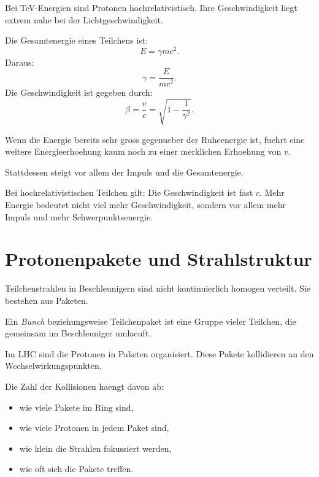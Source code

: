 Bei TeV-Energien sind Protonen hochrelativistisch.
Ihre Geschwindigkeit liegt extrem nahe bei der Lichtgeschwindigkeit.

\begin{formulabox}
Die Gesamtenergie eines Teilchens ist:
\[
    E = \gamma mc^2.
\]
Daraus:
\[
    \gamma = \frac{E}{mc^2}.
\]
Die Geschwindigkeit ist gegeben durch:
\[
    \beta=\frac{v}{c}
    =
    \sqrt{1-\frac{1}{\gamma^2}}.
\]
\end{formulabox}

\begin{conceptbox}
Wenn die Energie bereits sehr gross gegenueber der Ruheenergie ist, fuehrt eine
weitere Energieerhoehung kaum noch zu einer merklichen Erhoehung von $v$.

Stattdessen steigt vor allem der Impuls und die Gesamtenergie.
\end{conceptbox}

\begin{examtipbox}
Bei hochrelativistischen Teilchen gilt:
Die Geschwindigkeit ist fast $c$.
Mehr Energie bedeutet nicht viel mehr Geschwindigkeit, sondern vor allem mehr Impuls
und mehr Schwerpunktsenergie.
\end{examtipbox}

\section{Protonenpakete und Strahlstruktur}

Teilchenstrahlen in Beschleunigern sind nicht kontinuierlich homogen verteilt.
Sie bestehen aus Paketen.

\begin{definitionbox}
Ein \emph{Bunch} beziehungsweise Teilchenpaket ist eine Gruppe vieler Teilchen, die
gemeinsam im Beschleuniger umlaeuft.
\end{definitionbox}

\begin{conceptbox}
Im LHC sind die Protonen in Paketen organisiert.
Diese Pakete kollidieren an den Wechselwirkungspunkten.

Die Zahl der Kollisionen haengt davon ab:
\begin{itemize}
    \item wie viele Pakete im Ring sind,
    \item wie viele Protonen in jedem Paket sind,
    \item wie klein die Strahlen fokussiert werden,
    \item wie oft sich die Pakete treffen.
\end{itemize}
\end{conceptbox}

